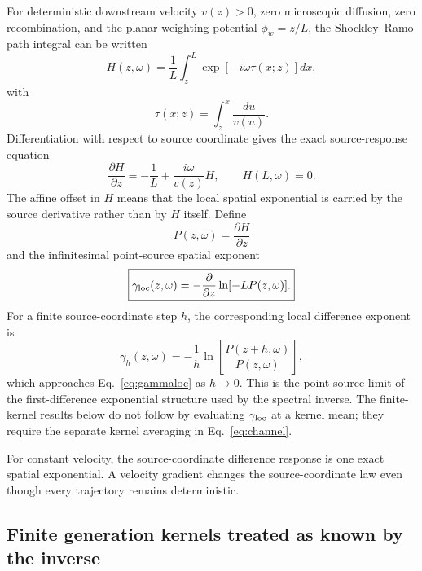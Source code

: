\documentclass[aps,pra,twocolumn,superscriptaddress,nofootinbib]{revtex4-2}
\begin{document}
For deterministic downstream velocity $v(z)>0$, zero microscopic diffusion, zero recombination, and the planar weighting potential $\phi_w=z/L$, the Shockley--Ramo path integral \cite{shockley1938,ramo1939} can be written
\begin{equation}
H(z,\omega)
=\frac{1}{L}\int_z^L
\exp\left[-i\omega\tau(x;z)\right]dx,
\label{eq:Hpath}
\end{equation}
with
\begin{equation}
\tau(x;z)=\int_z^x\frac{du}{v(u)}.
\end{equation}
Differentiation with respect to source coordinate gives the exact source-response equation
\begin{equation}
\boxed{
\frac{\partial H}{\partial z}
=-\frac{1}{L}+\frac{i\omega}{v(z)}H,
\qquad H(L,\omega)=0.
}
\label{eq:ramoode}
\end{equation}
The affine offset in $H$ means that the local spatial exponential is carried by the source derivative rather than by $H$ itself. Define
\begin{equation}
P(z,\omega)=\frac{\partial H}{\partial z}
\end{equation}
and the infinitesimal point-source spatial exponent
\begin{equation}
\boxed{
\gamma_{\rm loc}(z,\omega)
=-\frac{\partial}{\partial z}
\ln[-L P(z,\omega)].
}
\label{eq:gammaloc}
\end{equation}
For a finite source-coordinate step $h$, the corresponding local difference exponent is
\begin{equation}
\gamma_h(z,\omega)
=-\frac{1}{h}
\ln\!\left[\frac{P(z+h,\omega)}{P(z,\omega)}\right],
\end{equation}
which approaches Eq.~\eqref{eq:gammaloc} as $h\rightarrow0$.  This is the point-source limit of the first-difference exponential structure used by the spectral inverse.  The finite-kernel results below do not follow by evaluating $\gamma_{\rm loc}$ at a kernel mean; they require the separate kernel averaging in Eq.~\eqref{eq:channel}.

For constant velocity, the source-coordinate difference response is one exact spatial exponential. A velocity gradient changes the source-coordinate law even though every trajectory remains deterministic.

\subsection{Finite generation kernels treated as known by the inverse}
\end{document}
